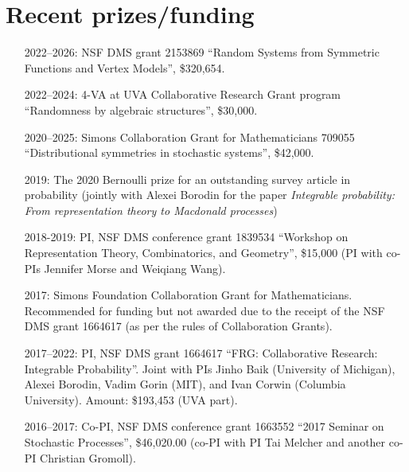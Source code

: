 \documentclass[letterpaper,11pt]{article}
\begin{document}
\section*{Recent prizes/funding}
\begin{itemize}
	\item [2022--2026:]
	NSF DMS grant 2153869
	``Random Systems from Symmetric Functions and Vertex Models'',
	\$320,654.

	\item [2022--2024:]
	4-VA at UVA Collaborative Research Grant program
	``Randomness by algebraic structures'',
	\$30,000.
	\item [2020--2025:]
		Simons Collaboration Grant for Mathematicians 709055
		``Distributional symmetries in stochastic systems'',
		\$42,000.
	\item [2019:]
		The 2020 Bernoulli prize for an outstanding survey article in probability
		(jointly with Alexei Borodin for the paper \emph{Integrable probability: From representation theory to
		Macdonald processes})
	\item
				[2018-2019:]
				PI, NSF DMS conference grant
				1839534
				``Workshop on Representation Theory, Combinatorics, and Geometry'',
				\$15,000
				(PI with co-PIs Jennifer Morse and Weiqiang Wang).
	\item
	      [2017:] Simons Foundation Collaboration Grant for
	      Mathematicians. Recommended for funding but not awarded due to
	      the receipt of the NSF DMS grant 1664617 (as per the rules of Collaboration
	      Grants).
	\item
	      [2017--2022:] PI, NSF DMS grant 1664617
	      ``FRG: Collaborative Research: Integrable Probability''.
	      Joint with PIs Jinho Baik (University of Michigan), Alexei
	      Borodin, Vadim Gorin (MIT), and Ivan Corwin (Columbia University). Amount:
	      \$193,453 (UVA part).
	\item
	      [2016--2017:]
	      Co-PI, NSF DMS conference grant 1663552 ``2017 Seminar on Stochastic
	      Processes'', \$46,020.00 (co-PI with PI Tai Melcher and another co-PI
	      Christian Gromoll).

\end{itemize}
\end{document}
